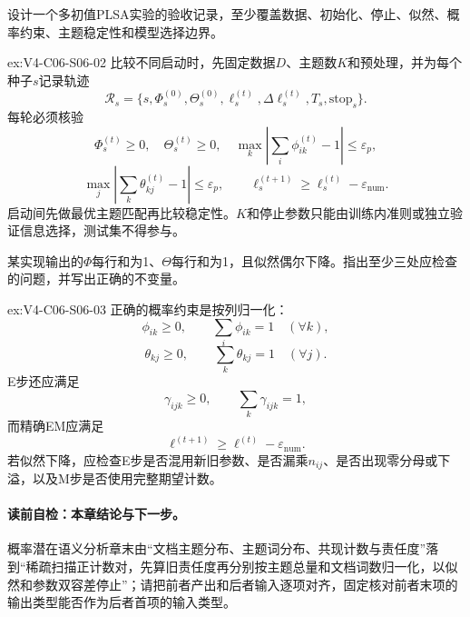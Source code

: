 \begin{SLChapterExercisePairSection}
\begin{exercise}\label{ex:V4-C06-S06-02}
设计一个多初值PLSA实验的验收记录，至少覆盖数据、初始化、停止、似然、概率约束、主题稳定性和模型选择边界。
\end{exercise}
\ifSLFullEdition
{}\label{sol:V4-C06-S06-02}
\begin{chapterexercisesolution}{ex:V4-C06-S06-02}
比较不同启动时，先固定数据$D$、主题数$K$和预处理，并为每个种子$s$记录轨迹
\[
\mathcal R_s=
\{s,\Phi_s^{(0)},\Theta_s^{(0)},\ell_s^{(t)},
\Delta\ell_s^{(t)},T_s,\text{stop}_s\}.
\]
每轮必须核验
\[
\Phi_s^{(t)}\ge0,
\quad \Theta_s^{(t)}\ge0,
\quad \max_k\left|\sum_i\phi_{ik}^{(t)}-1\right|\le\varepsilon_p,
\]
\[
\max_j\left|\sum_k\theta_{kj}^{(t)}-1\right|\le\varepsilon_p,
\qquad
\ell_s^{(t+1)}\ge\ell_s^{(t)}-\varepsilon_{\mathrm{num}}.
\]
启动间先做最优主题匹配再比较稳定性。$K$和停止参数只能由训练内准则或独立验证信息选择，测试集不得参与。
\end{chapterexercisesolution}
\fi

\begin{exercise}\label{ex:V4-C06-S06-03}
某实现输出的$\Phi$每行和为1、$\Theta$每行和为1，且似然偶尔下降。指出至少三处应检查的问题，并写出正确的不变量。
\end{exercise}
\ifSLFullEdition
{}\label{sol:V4-C06-S06-03}
\begin{chapterexercisesolution}{ex:V4-C06-S06-03}
正确的概率约束是按列归一化：
\[
\phi_{ik}\ge0,
\qquad
\sum_i\phi_{ik}=1\quad(\forall k),
\]
\[
\theta_{kj}\ge0,
\qquad
\sum_k\theta_{kj}=1\quad(\forall j).
\]
E步还应满足
\[
\gamma_{ijk}\ge0,
\qquad
\sum_k\gamma_{ijk}=1,
\]
而精确EM应满足
\[
\ell^{(t+1)}\ge\ell^{(t)}-\varepsilon_{\mathrm{num}}.
\]
若似然下降，应检查E步是否混用新旧参数、是否漏乘$n_{ij}$、是否出现零分母或下溢，以及M步是否使用完整期望计数。
\end{chapterexercisesolution}
\fi

\end{SLChapterExercisePairSection}

\paragraph{读前自检：本章结论与下一步。}概率潜在语义分析章末由“文档主题分布、主题词分布、共现计数与责任度”落到“稀疏扫描正计数对，先算旧责任度再分别按主题总量和文档词数归一化，以似然和参数双容差停止”；请把前者产出和后者输入逐项对齐，固定核对前者末项的输出类型能否作为后者首项的输入类型。\par


